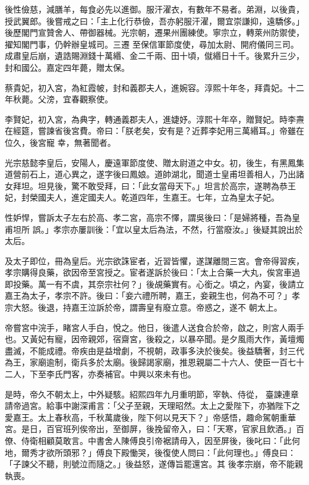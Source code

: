 \begin{pinyinscope}
 後性儉慈，減膳羊，每食必先以進御。服汗濯衣，有數年不易者。弟淵，以後貴，授武翼郎。後嘗戒之曰：「主上化行恭儉，吾亦躬服汗濯，爾宜崇謙抑，遠驕侈。」後歷閣門宣贊舍人、帶御器械。光宗朝，遷果州團練使。寧宗立，轉萊州防禦使，擢知閣門事，仍幹辦皇城司。三遷
 至保信軍節度使，尋加太尉、開府儀同三司。成肅皇后崩，遺誥賜淵錢十萬緡、金二千兩、田十頃，僦緡日十千。後累升三少，封和國公。嘉定四年薨，贈太保。



 蔡貴妃，初入宮，為紅霞帔，封和義郡夫人，進婉容。淳熙十年冬，拜貴妃。十二年秋薨。父滂，宜春觀察使。



 李賢妃，初入宮，為典字，轉通義郡夫人，進婕妤。淳熙十年卒，贈賢妃。時李燾在經筵，嘗諫省後宮費。帝曰：「朕老矣，安有是？近葬李妃用三萬緡耳。」帝雖在位久，後宮寵
 幸，無著聞者。



 光宗慈懿李皇后，安陽人，慶遠軍節度使、贈太尉道之中女。初，後生，有黑鳳集道營前石上，道心異之，遂字後曰鳳娘。道帥湖北，聞道士皇甫坦善相人，乃出諸女拜坦。坦見後，驚不敢受拜，曰：「此女當母天下。」坦言於高宗，遂聘為恭王妃，封榮國夫人，進定國夫人。乾道四年，生嘉王。七年，立為皇太子妃。



 性妒悍，嘗訴太子左右於高、孝二宮，高宗不懌，謂吳後曰：「是婦將種，吾為皇甫坦所
 誤。」孝宗亦屢訓後：「宜以皇太后為法，不然，行當廢汝。」後疑其說出於太后。



 及太子即位，冊為皇后。光宗欲誅宦者，近習皆懼，遂謀離間三宮。會帝得習疾，孝宗購得良藥，欲因帝至宮授之。宦者遂訴於後曰：「太上合藥一大丸，俟宮車過即投藥。萬一有不虞，其奈宗社何？」後覘藥實有。心銜之。頃之，內宴，後請立嘉王為太子，孝宗不許。後曰：「妾六禮所聘，嘉王，妾親生也，何為不可？」孝宗大怒。後退，持嘉王泣訴於帝，謂壽皇有廢立意。帝惑之，遂不
 朝太上。



 帝嘗宮中浣手，睹宮人手白，悅之。他日，後遣人送食合於帝，啟之，則宮人兩手也。又黃妃有寵，因帝親郊，宿齋宮，後殺之，以暴卒聞。是夕風雨大作，黃壇燭盡滅，不能成禮。帝疾由是益增劇，不視朝，政事多決於後矣。後益驕奢，封三代為王，家廟逾制，衛兵多於太廟。後歸謁家廟，推恩親屬二十六人、使臣一百七十二人，下至李氏門客，亦奏補官。中興以來未有也。



 是時，帝久不朝太上，中外疑駭。紹熙四年九月重明節，宰執、侍從，
 臺諫連章請帝過宮。給事中謝深甫言：「父子至親，天理昭然。太上之愛陛下，亦猶陛下之愛嘉王。太上春秋高，千秋萬歲後，陛下何以見天下？」帝感悟，趣命駕朝重華宮。是日，百官班列俟帝出，至御屏，後挽留帝入，曰：「天寒，官家且飲酒。」百僚、侍衛相顧莫敢言。中書舍人陳傅良引帝裾請毋入，因至屏後，後叱曰：「此何地，爾秀才欲所頭邪？」傅良下殿慟哭，後復使人問曰：「此何理也。」傅良曰：「子諫父不聽，則號泣而隨之。」後益怒，遂傳旨罷還宮。其
 後孝宗崩，帝不能親執喪。




\end{pinyinscope}
